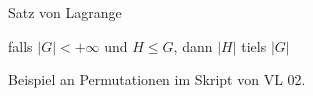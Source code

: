 \documentclass[class=article, crop=false]{standalone}
\begin{document}
\begin{zettel}{Satz von Lagrange}
\begin{flashcard}[]{}
	\begin{theorem}
		falls $ |G| <  + \infty $ und $H \leq G$, dann $ |H|$ tiels $ |G|$
	\end{theorem}
\end{flashcard}
\begin{example}
	Beispiel an Permutationen im Skript von VL 02.
\end{example}
\end{zettel}
\end{document}
